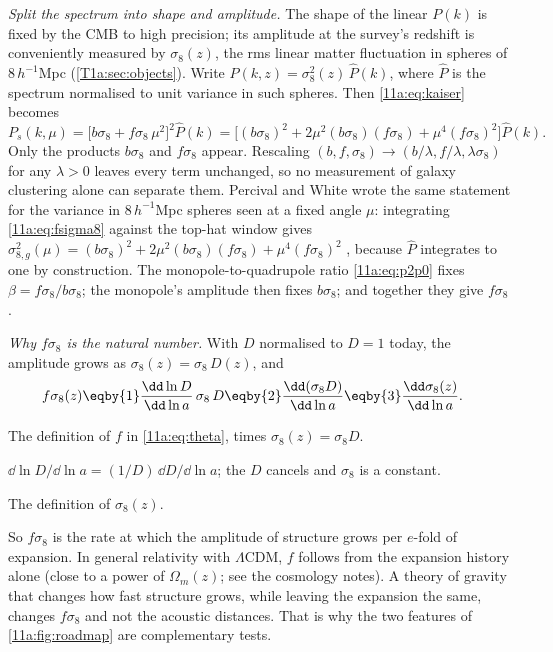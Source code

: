 \emph{Split the spectrum into shape and amplitude.} The shape of the linear $P(k)$
is fixed by the CMB to high precision; its amplitude at the survey's redshift is
conveniently measured by $\sigma_8(z)$, the rms linear matter fluctuation in
spheres of $8\,h^{-1}$Mpc (\cref{T1a:sec:objects}). Write
$P(k,z)=\sigma_8^2(z)\,\hat P(k)$, where $\hat P$ is the spectrum normalised to
unit variance in such spheres. Then \eqref{11a:eq:kaiser} becomes
\begin{equation}
  P_s(k,\mu)=\bigl[b\sigma_8+f\sigma_8\,\mu^2\bigr]^2\hat P(k)
  =\bigl[(b\sigma_8)^2+2\mu^2(b\sigma_8)(f\sigma_8)+\mu^4(f\sigma_8)^2\bigr]\hat P(k).
  \label{11a:eq:fsigma8}
\end{equation}
Only the products $b\sigma_8$ and $f\sigma_8$ appear. Rescaling
$(b,f,\sigma_8)\to(b/\lambda,f/\lambda,\lambda\sigma_8)$ for any $\lambda>0$ leaves
every term unchanged, so no measurement of galaxy clustering alone can separate
them. Percival and White wrote the same statement for the variance in
$8\,h^{-1}$Mpc spheres seen at a fixed angle $\mu$: integrating
\eqref{11a:eq:fsigma8} against the top-hat window gives
$\sigma_{8,g}^2(\mu)=(b\sigma_8)^2+2\mu^2(b\sigma_8)(f\sigma_8)+\mu^4(f\sigma_8)^2$
, because $\hat P$ integrates to one by
construction. The monopole-to-quadrupole ratio \eqref{11a:eq:p2p0} fixes
$\beta=f\sigma_8/b\sigma_8$; the monopole's amplitude then fixes $b\sigma_8$; and
together they give $f\sigma_8$.

\emph{Why $f\sigma_8$ is the natural number.} With $D$ normalised to $D=1$ today,
the amplitude grows as $\sigma_8(z)=\sigma_8\,D(z)$, and
\begin{align*}
  f\sigma_8(z)
  &\eqby{1}\frac{\dd\ln D}{\dd\ln a}\,\sigma_8\,D
   \eqby{2}\frac{\dd(\sigma_8D)}{\dd\ln a}
   \eqby{3}\frac{\dd\sigma_8(z)}{\dd\ln a}.
\end{align*}
\begin{explain}
  \item The definition of $f$ in \eqref{11a:eq:theta}, times $\sigma_8(z)=\sigma_8D$.
  \item $\dd\ln D/\dd\ln a=(1/D)\,\dd D/\dd\ln a$; the $D$ cancels and $\sigma_8$
        is a constant.
  \item The definition of $\sigma_8(z)$.
\end{explain}
So $f\sigma_8$ is the rate at which the amplitude of structure grows per
$e$-fold of expansion. In general relativity with $\Lambda$CDM, $f$ follows from
the expansion history alone (close to a power of $\Omega_m(z)$; see the cosmology
notes). A theory of gravity that changes how fast structure grows, while leaving
the expansion the same, changes $f\sigma_8$ and not the acoustic distances. That
is why the two features of \cref{11a:fig:roadmap} are complementary tests.

